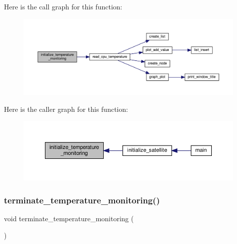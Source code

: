 Here is the call graph for this function\+:
\nopagebreak
\begin{figure}[H]
\begin{center}
\leavevmode
\includegraphics[width=350pt]{temperature-monitoring_8h_a1d2bab81a3e6aa84eb0c2e0172594299_cgraph}
\end{center}
\end{figure}
Here is the caller graph for this function\+:
\nopagebreak
\begin{figure}[H]
\begin{center}
\leavevmode
\includegraphics[width=350pt]{temperature-monitoring_8h_a1d2bab81a3e6aa84eb0c2e0172594299_icgraph}
\end{center}
\end{figure}
\mbox{\label{temperature-monitoring_8h_a8b1be00dadac2a3d808233430fb2cf8b}} 
\subsubsection{\texorpdfstring{terminate\+\_\+temperature\+\_\+monitoring()}{terminate\_temperature\_monitoring()}}
{\footnotesize\ttfamily void terminate\+\_\+temperature\+\_\+monitoring (\begin{DoxyParamCaption}{ }\end{DoxyParamCaption})}

